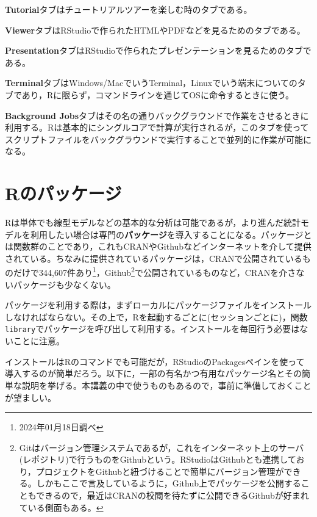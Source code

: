 \documentclass[
  a4paper,
]{ltjsbook}
\begin{document}
\textbf{Tutorial}タブはチュートリアルツアーを楽しむ時のタブである。

\textbf{Viewer}タブはRStudioで作られたHTMLやPDFなどを見るためのタブである。

\textbf{Presentation}タブはRStudioで作られたプレゼンテーションを見るためのタブである。

\textbf{Terminal}タブはWindows/MacでいうTerminal，Linuxでいう端末についてのタブであり，Rに限らず，コマンドラインを通じてOSに命令するときに使う。

\textbf{Background
Jobs}タブはその名の通りバックグラウンドで作業をさせるときに利用する。Rは基本的にシングルコアで計算が実行されるが，このタブを使ってスクリプトファイルをバックグラウンドで実行することで並列的に作業が可能になる。

\hypertarget{rux306eux30d1ux30c3ux30b1ux30fcux30b8}{%
\section{Rのパッケージ}\label{rux306eux30d1ux30c3ux30b1ux30fcux30b8}}

Rは単体でも線型モデルなどの基本的な分析は可能であるが，より進んだ統計モデルを利用したい場合は専門の\textbf{パッケージ}を導入することになる。パッケージとは関数群のことであり，これもCRANやGithubなどインターネットを介して提供されている。ちなみに提供されているパッケージは，CRANで公開されているものだけで344,607件あり\footnote{2024年01月18日調べ}，Github\footnote{Gitはバージョン管理システムであるが，これをインターネット上のサーバ(レポジトリ)で行うものをGithubという。RStudioはGithubとも連携しており，プロジェクトをGithubと紐づけることで簡単にバージョン管理ができる。しかもここで言及しているように，Github上でパッケージを公開することもできるので，最近はCRANの校閲を待たずに公開できるGithubが好まれている側面もある。}で公開されているものなど，CRANを介さないパッケージも少なくない。

パッケージを利用する際は，まずローカルにパッケージファイルをインストールしなければならない。その上で，Rを起動するごとに(セッションごとに)，関数\texttt{library}でパッケージを呼び出して利用する。インストールを毎回行う必要はないことに注意。

インストールはRのコマンドでも可能だが，RStudioのPackagesペインを使って導入するのが簡単だろう。以下に，一部の有名かつ有用なパッケージ名とその簡単な説明を挙げる。本講義の中で使うものもあるので，事前に準備しておくことが望ましい。
\end{document}

